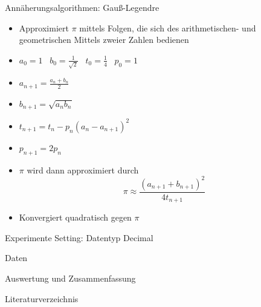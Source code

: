 \documentclass{beamer}
\begin{document}
\begin{frame}{Annäherungsalgorithmen: Gauß-Legendre}                                                                                                        %
    \begin{itemize}                                                                                                                                         
        \item<1-> Approximiert \(\pi\) mittels Folgen, die sich des arithmetischen- und geometrischen Mittels zweier Zahlen bedienen
        \item<2-> \( a_0 = 1 \;\;\; b_0 = \frac{1}{\sqrt{2}} \;\;\; t_0 = \frac{1}{4} \;\;\; p_0 = 1 \)
        \item<3-> \( a_{n+1} = \frac{a_n + b_n}{2} \)
        \item<4-> \( b_{n+1} = \sqrt{a_nb_n} \)
        \item<5-> \( t_{n+1} = t_n - p_n(a_n - a_{n+1})^2 \)
        \item<6-> \( p_{n+1} = 2p_n \)
        \item<7-> \(\pi\) wird dann approximiert durch \[ \pi \approx \frac{(a_{n+1} + b_{n+1})^2}{4t_{n+1}} \]
        \item<8-> Konvergiert quadratisch gegen \(\pi\) \cite{Gauß-Legendre}
    \end{itemize}   
\end{frame}


\begin{frame}{Experimente}  
    Setting: Datentyp Decimal
\end{frame}

\begin{frame}{Daten}

\end{frame}



\begin{frame}{Auswertung und Zusammenfassung}

\end{frame}

\begin{frame}{Literaturverzeichnis}
\printbibliography
\end{frame}
\end{document}
